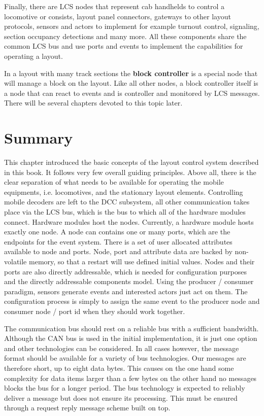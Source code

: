 Finally, there are LCS nodes that represent cab handhelds to control a locomotive or consists, layout panel connectors, gateways to other layout protocols, sensors and actors to implement for example turnout control, signaling, section occupancy detections and many more. All these components share the common LCS bus and use ports and events to implement the capabilities for operating a layout.

In a layout with many track sections the {\bf block controller} is a special node that will manage a block on the layout. Like all other nodes, a block controller itself is a node that can react to events and is controller and monitored by LCS messages. There will be several chapters devoted to this topic later.

\section{Summary}

This chapter introduced the basic concepts of the layout control system described in this book. It follows very few overall guiding principles. Above all, there is the clear separation of what needs to be available for operating the mobile equipments, i.e. locomotives, and the stationary layout elements. Controlling mobile decoders are left to the DCC subsystem, all other communication takes place via the LCS bus, which is the bus to which all of the hardware modules connect. Hardware modules host the nodes. Currently, a hardware module hosts exactly one node. A node can contains one or many ports, which are the endpoints for the event system. There is a set of user allocated attributes available to node and ports. Node, port and attribute data are backed by non-volatile memory, so that a restart will use defined initial values. Nodes and their ports are also directly addressable, which is needed for configuration purposes and the directly addressable components model. Using the producer / consumer paradigm, sensors generate events and interested actors just act on them. The configuration process is simply to assign the same event to the producer node and consumer node / port id when they should work together.

The communication bus should rest on a reliable bus with a sufficient bandwidth. Although the CAN bus is used in the initial implementation, it is just one option and other technologies can be considered. In all cases however, the message format should be available for a variety of bus technologies. Our messages are therefore short, up to eight data bytes. This causes on the one hand some complexity for data items larger than a few bytes on the other hand no messages blocks the bus for a longer period. The bus technology is expected to reliably deliver a message but does not ensure its processing. This must be ensured through a request reply message scheme built on top.

